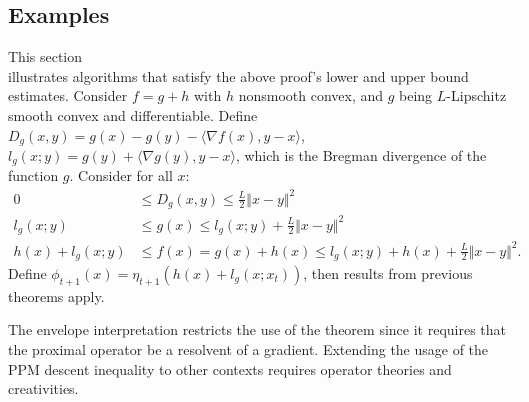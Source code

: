 \documentclass[12pt]{article}
\begin{document}
    \subsection{Examples}
        \begin{example}
            This section \\ illustrates algorithms that satisfy the above proof's lower and upper bound estimates. 
            Consider $f = g + h$ with $h$ nonsmooth convex, and $g$ being $L$-Lipschitz smooth convex and differentiable. 
            Define $D_g(x, y) = g(x) - g(y) - \langle \nabla f(x), y - x\rangle$, $l_g(x; y) = g(y) + \langle \nabla g(y), y - x\rangle$, which is the Bregman divergence of the function $g$. 
            Consider for all $x$: 
            \begin{align*}
                0 & \le 
                D_g (x, y) \le  \frac{L}{2} \Vert x - y\Vert^2 
                \\
                l_g (x; y) &\le 
                g(x) 
                \le l_g(x; y) + \frac{L}{2} \Vert x - y\Vert^2 
                \\
                h(x) + l_g(x; y) &\le f(x) = g(x) + h(x)
                \le 
                l_g(x; y) + h(x) + \frac{L}{2}\Vert x - y\Vert^2. 
            \end{align*}
            Define $\phi_{t + 1} (x) = \eta_{t + 1}(h(x) + l_g(x; x_t))$, then results from previous theorems apply.    
        \end{example}
        \begin{remark}
            The envelope interpretation restricts the use of the theorem since it requires that the proximal operator be a resolvent of a gradient. 
            Extending the usage of the PPM descent inequality to other contexts requires operator theories and creativities. 
        \end{remark}
\end{document}
